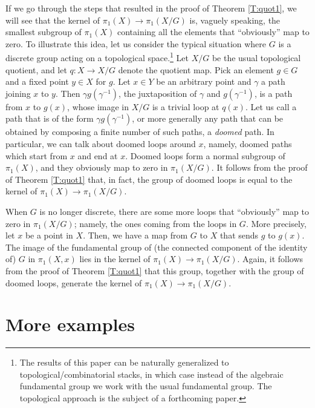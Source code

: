 \documentclass{amsart}
\theoremstyle{definition}
\theoremstyle{remark}
\theoremstyle{remark}
\let\:=\colon
\begin{document}
 If we go through the steps that resulted in the proof of Theorem
 \ref{T:quot1}, we will see that the kernel of $\pi_1(X) \to
 \pi_1(X/G)$ is, vaguely speaking, the smallest subgroup of
 $\pi_1(X)$ containing all the elements that ``obviously'' map to
 zero. To illustrate this idea, let us consider the typical
 situation  where $G$ is a discrete group acting on a topological
 space.\footnote{The results of this paper can be naturally
 generalized to topological/combinatorial stacks, in which case
 instead of the algebraic fundamental group we work with the usual
 fundamental group. The topological approach is the subject of a
 forthcoming paper.} Let $X/G$ be the usual topological quotient,
 and let $q \: X \to X/G$ denote the quotient map. Pick an element
 $g \in G$ and a fixed point $y \in X$ for $g$. Let $x \in Y$ be
 an arbitrary point and $\gamma$ a path joining $x$ to $y$. Then
 $\gamma g(\gamma^{-1})$, the juxtaposition of $\gamma$ and
 $g(\gamma^{-1})$, is a path from $x$ to $g(x)$, whose image in
 $X/G$ is a trivial loop at $q(x)$. Let us call a path that is of
 the form  $\gamma g(\gamma^{-1})$, or more generally any path
 that can be obtained by composing a finite number of such paths,
 a {\em doomed} path. In particular, we can talk about doomed
 loops around $x$, namely, doomed paths which  start from $x$ and
 end at $x$. Doomed loops form a normal subgroup of $\pi_1(X)$,
 and they obviously map to zero in $\pi_1(X/G)$. It follows from
 the proof of Theorem \ref{T:quot1} that, in fact, the group of
 doomed loops is equal to the kernel of $\pi_1(X) \to \pi_1(X/G)$.

 When $G$ is no longer discrete, there are some more loops that
 ``obviously'' map to zero in $\pi_1(X/G)$; namely, the ones
 coming from the loops in $G$. More precisely, let $x$ be a point
 in $X$. Then, we have a map from $G$ to $X$ that sends $g$ to
 $g(x)$. The image of the fundamental group of (the connected
 component of the identity of) $G$ in $\pi_1(X,x)$ lies in the
 kernel of $\pi_1(X) \to \pi_1(X/G)$. Again, it follows from the
 proof of Theorem \ref{T:quot1} that this group, together with the
 group of doomed loops, generate the kernel of $\pi_1(X) \to
 \pi_1(X/G)$.

\section{More examples}{\label{S:examples}}
\end{document}
